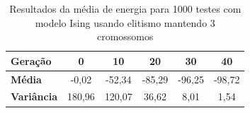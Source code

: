 \begin{table}[htb]
	\centering
	\begin{tabular}{|l|c|c|c|c|c|}
		\hline
		\textbf{Geração}   & \textbf{0} & \textbf{10} & \textbf{20} & \textbf{30} & \textbf{40} \\ \hline
		\textbf{Média}     & -0,02       & -52,34      & -85,29      & -96,25      & -98,72      \\ \hline
		\textbf{Variância} & 180,96     & 120,07      & 36,62       & 8,01       & 1,54       \\ \hline
	\end{tabular}
	\caption{Resultados da média de energia para 1000 testes com modelo Ising usando elitismo mantendo 3 cromossomos}
	\label{tab:resultados_medias_var2}
\end{table}


